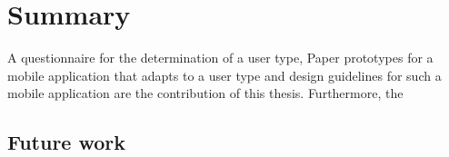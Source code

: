 \chapter{Summary}

A questionnaire for the determination of a user type, Paper prototypes for a mobile application that adapts to a user type and design guidelines for such a mobile application are the contribution of this thesis. Furthermore, the 

\section{Future work}